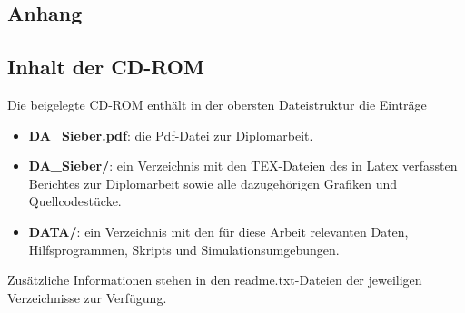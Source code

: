 %
%
\begin{appendix}
\chapter*{Anhang}
\setcounter{chapter}{1} %

\newpage
\section{Inhalt der CD-ROM}
Die beigelegte CD-ROM enthält in der obersten Dateistruktur die Einträge

\begin{itemize}
\item \textbf{DA\_Sieber.pdf}: die Pdf-Datei zur Diplomarbeit.
%
\item \textbf{DA\_Sieber/}: ein Verzeichnis mit den TEX-Dateien des in
Latex verfassten Berichtes zur Diplomarbeit sowie alle
dazugehörigen Grafiken und Quellcodestücke.
% 
\item \textbf{DATA/}: ein Verzeichnis mit den für diese Arbeit
relevanten Daten, Hilfsprogrammen, Skripts und Simulationsumgebungen.
%
\end{itemize} 

Zusätzliche Informationen stehen in den readme.txt-Dateien der
jeweiligen Verzeichnisse zur Verfügung.

\end{appendix}